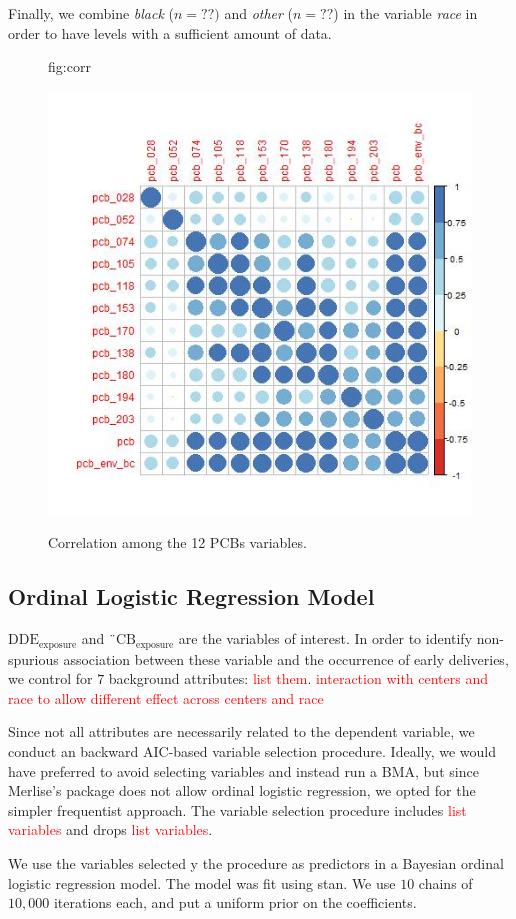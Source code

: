 \documentclass[wcp]{jmlr}%
\newcommand\todo[1]{\textcolor{red}{#1}}
\begin{document}
Finally, we combine \textit{black} ($n=??)$ and \textit{other} ($n=??$) in the variable \textit{race} in order to have levels with a sufficient amount of data.

\begin{figure}[htbp]
	\floatconts
	{fig:corr}
	{\caption{Correlation among the 12 PCBs variables.}}
	{\includegraphics[width=0.8\linewidth]{pcb_corr}}
\end{figure}

\subsection{Ordinal Logistic Regression Model}
$\text{DDE}_{\text{exposure}}$ and $\text{¨CB}_{\text{exposure}}$ are the variables of interest. In order to identify non-spurious association between these variable and the occurrence of early deliveries, we control for $7$ background attributes: \todo{list them}.
\todo{interaction with centers and race to allow different effect across centers and race}

Since not all attributes are necessarily related to the dependent variable, we conduct an backward AIC-based variable selection procedure. Ideally, we would have preferred to avoid selecting variables and instead run a BMA, but since Merlise's package does not allow ordinal logistic regression, we opted for the simpler frequentist approach. The variable selection procedure includes \todo{list variables} and drops \todo{list variables}.

We use the variables selected y the procedure as predictors in a Bayesian ordinal logistic regression model. The model was fit using stan. We use $10$ chains of $10,000$ iterations each, and put a uniform prior on the coefficients.
\end{document}
